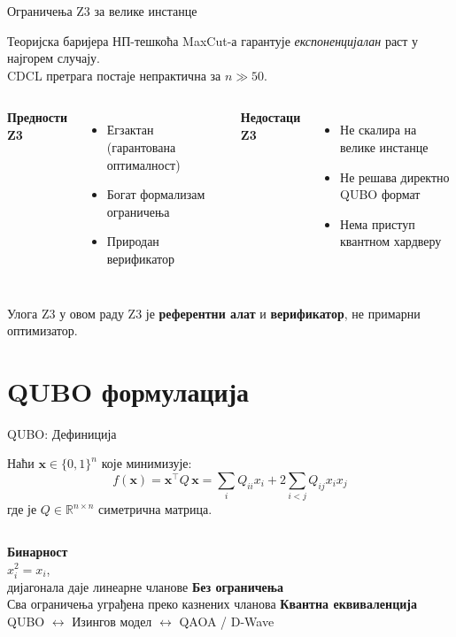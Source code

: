 \documentclass[aspectratio=169]{beamer}
\begin{document}
\begin{frame}{Ограничења Z3 за велике инстанце}
  \begin{block}{Теоријска баријера}
    НП-тешкоћа MaxCut-а гарантује \emph{експоненцијалан} раст у најгорем случају.\\
    CDCL претрага постаје непрактична за $n \gg 50$.
  \end{block}

  \bigskip
  \begin{columns}[T]
      \textbf{Предности Z3}
      \begin{itemize}
        \item Егзактан (гарантована оптималност)
        \item Богат формализам ограничења
        \item Природан верификатор
      \end{itemize}
      \textbf{Недостаци Z3}
      \begin{itemize}
        \item Не скалира на велике инстанце
        \item Не решава директно QUBO формат
        \item Нема приступ квантном хардверу
      \end{itemize}
  \end{columns}

  \bigskip
  \begin{alertblock}{Улога Z3 у овом раду}
    Z3 је \textbf{референтни алат} и \textbf{верификатор}, не примарни оптимизатор.
  \end{alertblock}
\end{frame}

\section{QUBO формулација}

\begin{frame}{QUBO: Дефиниција}
  \begin{definition}[QUBO]
    Наћи $\mathbf{x} \in \{0,1\}^n$ које минимизује:
    \[
      f(\mathbf{x}) = \mathbf{x}^\top Q\, \mathbf{x}
        = \sum_{i} Q_{ii} x_i + 2\sum_{i<j} Q_{ij} x_i x_j
    \]
    где је $Q \in \mathbb{R}^{n\times n}$ симетрична матрица.
  \end{definition}

  \bigskip
  \begin{columns}[T]
      \textbf{Бинарност}\\
      $x_i^2 = x_i$,\\
      дијагонала даје линеарне чланове
      \textbf{Без ограничења}\\
      Сва ограничења уграђена преко казнених чланова
      \textbf{Квантна еквиваленција}\\
      QUBO $\leftrightarrow$ Изингов модел $\leftrightarrow$ QAOA / D-Wave
  \end{columns}
\end{frame}
\end{document}
